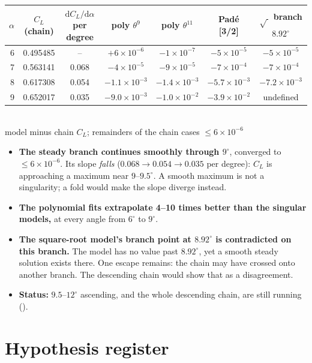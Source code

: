 \documentclass[11pt,a4paper]{article}
\newcommand{\CL}{C_L}
\begin{document}
\begin{center}\small
\begin{tabular}{rcccccc}
\toprule
$\alpha$ & $\CL$ (chain) & $\mathrm{d}\CL/\mathrm{d}\alpha$ per degree & poly $\theta^9$ & poly $\theta^{11}$ & Padé [3/2] & $\sqrt{\ }$ branch $8.92^\circ$\\
\midrule
6 & 0.495485 & -- & $+6\times10^{-6}$ & $-1\times10^{-7}$ & $-5\times10^{-5}$ & $-5\times10^{-5}$\\
7 & 0.563141 & 0.068 & $-4\times10^{-5}$ & $-9\times10^{-5}$ & $-7\times10^{-4}$ & $-7\times10^{-4}$\\
8 & 0.617308 & 0.054 & $-1.1\times10^{-3}$ & $-1.4\times10^{-3}$ & $-5.7\times10^{-3}$ & $-7.2\times10^{-3}$\\
9 & 0.652017 & 0.035 & $-9.0\times10^{-3}$ & $-1.0\times10^{-2}$ & $-3.9\times10^{-2}$ & undefined\\
\bottomrule
\end{tabular}\\[2pt]
model minus chain $\CL$; remainders of the chain cases $\le6\times10^{-6}$
\end{center}

\begin{itemize}[leftmargin=*]
\item \textbf{The steady branch continues smoothly through $9^\circ$}, converged to $\le6\times10^{-6}$. Its
  slope \emph{falls} ($0.068 \to 0.054 \to 0.035$ per degree): $\CL$ is approaching a maximum near
  $9$--$9.5^\circ$. A smooth maximum is not a singularity; a fold would make the slope diverge instead.
\item \textbf{The polynomial fits extrapolate 4--10 times better than the singular models,} at every
  angle from $6^\circ$ to $9^\circ$.
\item \textbf{The square-root model's branch point at $8.92^\circ$ is contradicted on this branch.} The
  model has no value past $8.92^\circ$, yet a smooth steady solution exists there. One escape remains: the
  chain may have crossed onto another branch. The descending chain would show that as a disagreement.
\item \textbf{Status:} $9.5$--$12^\circ$ ascending, and the whole descending chain, are still running
  ().
\end{itemize}

\section{Hypothesis register}\label{sec:register}
\end{document}
